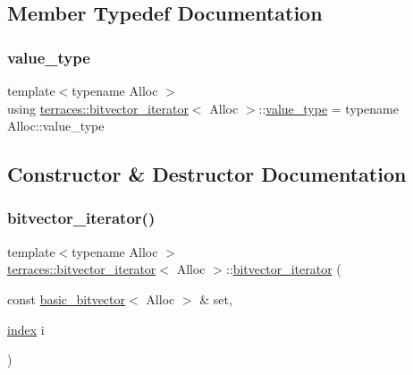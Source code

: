 \subsection{Member Typedef Documentation}
\mbox{\label{classterraces_1_1bitvector__iterator_a8156fa80ed2f7604e66ed92516064472}} 
\subsubsection{\texorpdfstring{value\+\_\+type}{value\_type}}
{\footnotesize\ttfamily template$<$typename Alloc $>$ \\
using \hyperlink{classterraces_1_1bitvector__iterator}{terraces\+::bitvector\+\_\+iterator}$<$ Alloc $>$\+::\hyperlink{classterraces_1_1bitvector__iterator_a8156fa80ed2f7604e66ed92516064472}{value\+\_\+type} =  typename Alloc\+::value\+\_\+type}



\subsection{Constructor \& Destructor Documentation}
\mbox{\label{classterraces_1_1bitvector__iterator_afebccf304754e00d27e87508c4e43a4c}} 
\subsubsection{\texorpdfstring{bitvector\+\_\+iterator()}{bitvector\_iterator()}}
{\footnotesize\ttfamily template$<$typename Alloc $>$ \\
\hyperlink{classterraces_1_1bitvector__iterator}{terraces\+::bitvector\+\_\+iterator}$<$ Alloc $>$\+::\hyperlink{classterraces_1_1bitvector__iterator}{bitvector\+\_\+iterator} (\begin{DoxyParamCaption}\item[{const \hyperlink{classterraces_1_1basic__bitvector}{basic\+\_\+bitvector}$<$ Alloc $>$ \&}]{set,  }\item[{\hyperlink{namespaceterraces_adbc33ccb543d1634e96d0eb02e472c77}{index}}]{i }\end{DoxyParamCaption})\hspace{0.3cm}{\ttfamily [inline]}}




